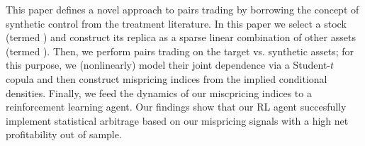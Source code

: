 This paper defines a novel approach to pairs trading by borrowing the concept of synthetic control from the treatment literature. In this paper we select a stock (termed ) and construct its replica as a sparse linear combination of other assets (termed ). Then, we perform pairs trading on the target vs. synthetic assets; for this purpose, we (nonlinearly) model their joint dependence via a Student-$t$ copula and then construct mispricing indices from the implied conditional densities. Finally, we feed the dynamics of our miscpricing indices to a reinforcement learning agent. Our findings show that our RL agent succesfully implement statistical arbitrage based on our mispricing signals with a high net profitability out of sample. 


